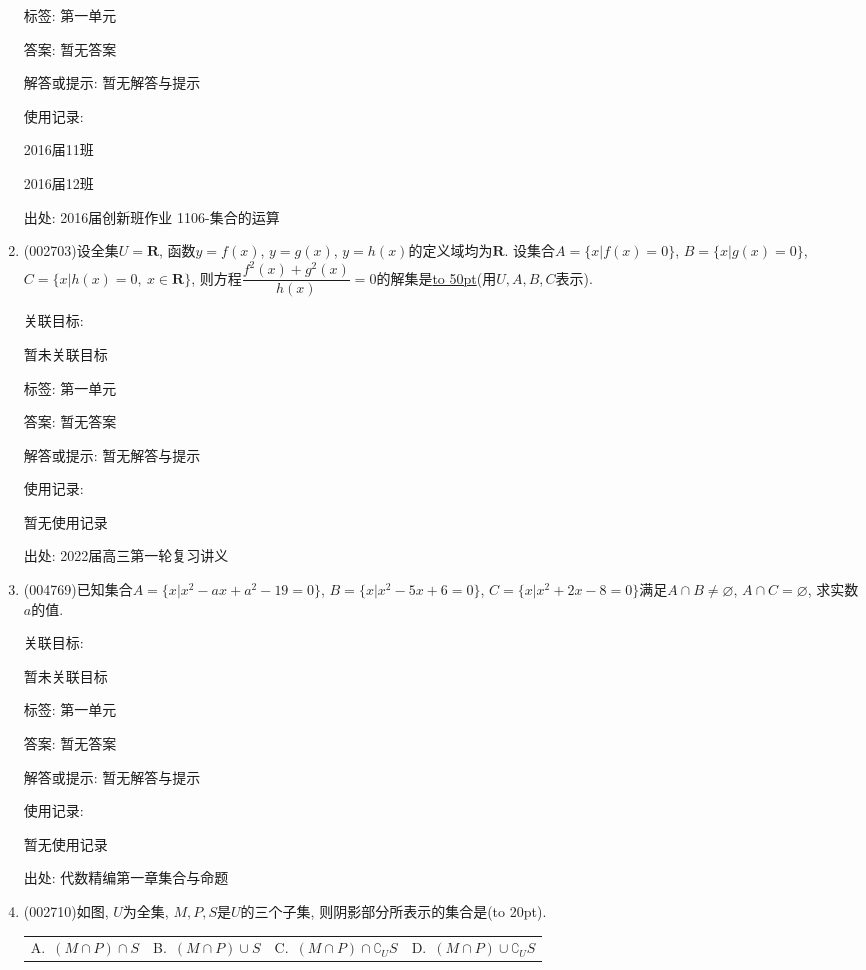 \documentclass[10pt,a4paper]{article}
\newcommand{\blank}[1]{\underline{\hbox to #1pt{}}}
\newcommand{\bracket}[1]{(\hbox to #1pt{})}
\newcommand{\fourch}[4]{\par\begin{tabular}{p{.23\textwidth}p{.23\textwidth}p{.23\textwidth}p{.23\textwidth}}
A.~#1 &B.~#2& C.~#3& D.~#4
\end{tabular}}
\begin{document}
\begin{enumerate}[1.]
标签: 第一单元

答案: 暂无答案

解答或提示: 暂无解答与提示

使用记录:

2016届11班	

2016届12班	


出处: 2016届创新班作业	1106-集合的运算
\item { (002703)}设全集$U=\mathbf{R}$, 函数$y=f(x)$, $y=g(x)$, $y=h(x)$的定义域均为$\mathbf{R}$. 设集合$A=\{x|f(x)=0\}$, $B=\{x|g(x)=0\}$, $C=\{x|h(x)=0, \ x\in \mathbf{R}\}$, 则方程$\dfrac{f^2(x)+g^2(x)}{h(x)}=0$的解集是\blank{50}(用$U,A,B,C$表示).


关联目标:

暂未关联目标



标签: 第一单元

答案: 暂无答案

解答或提示: 暂无解答与提示

使用记录:

暂无使用记录


出处: 2022届高三第一轮复习讲义
\item { (004769)}已知集合$A=\{x|x^2- ax+a^2-19=0\}$, $B=\{x|x^2-5x+6=0\}$, $C=\{ x|x^2+2x-8=0\}$满足$A\cap B\ne \varnothing$, $A\cap C=\varnothing$, 求实数$a$的值.


关联目标:

暂未关联目标



标签: 第一单元

答案: 暂无答案

解答或提示: 暂无解答与提示

使用记录:

暂无使用记录


出处: 代数精编第一章集合与命题
\item { (002710)}如图, $U$为全集, $M,P,S$是$U$的三个子集, 则阴影部分所表示的集合是\bracket{20}.
\begin{center}
\end{center}
\fourch{$(M\cap P)\cap S$}{$(M\cap P)\cup S$}{$(M\cap P)\cap \complement_U S$}{$(M\cap P)\cup \complement_U S$}



\end{enumerate}
\end{document}
